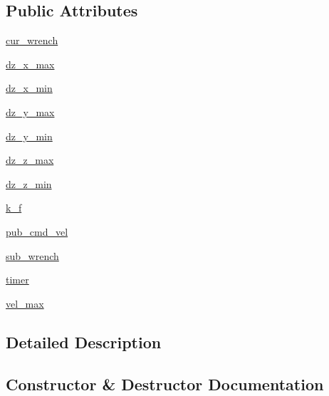 \subsection*{Public Attributes}
\begin{DoxyCompactItemize}
\item 
\hyperlink{classadmittance__ctrl_1_1AdmittanceCtrl_a3654d3f7f31c450d8cb010a4dadb3e18}{cur\+\_\+wrench}
\item 
\hyperlink{classadmittance__ctrl_1_1AdmittanceCtrl_a5f68a4404ad164497f0a5e57adc06ae5}{dz\+\_\+x\+\_\+max}
\item 
\hyperlink{classadmittance__ctrl_1_1AdmittanceCtrl_ae12abadbff515007a7857f4ad04a2068}{dz\+\_\+x\+\_\+min}
\item 
\hyperlink{classadmittance__ctrl_1_1AdmittanceCtrl_af0acd0a0262fbcc79e90b8035e3197d6}{dz\+\_\+y\+\_\+max}
\item 
\hyperlink{classadmittance__ctrl_1_1AdmittanceCtrl_a35e4e59c55a85d6dbc1f5ccfc5b87f25}{dz\+\_\+y\+\_\+min}
\item 
\hyperlink{classadmittance__ctrl_1_1AdmittanceCtrl_ab3d7954604431dd6244691fd54112420}{dz\+\_\+z\+\_\+max}
\item 
\hyperlink{classadmittance__ctrl_1_1AdmittanceCtrl_a6c0fe2e42dde125b1e6f81814ce57c02}{dz\+\_\+z\+\_\+min}
\item 
\hyperlink{classadmittance__ctrl_1_1AdmittanceCtrl_a9a0d5d08a89a7cc49b27a9de9d44d8d6}{k\+\_\+f}
\item 
\hyperlink{classadmittance__ctrl_1_1AdmittanceCtrl_a9e2e5b35def00bad6fc3fec2d80c63c4}{pub\+\_\+cmd\+\_\+vel}
\item 
\hyperlink{classadmittance__ctrl_1_1AdmittanceCtrl_abcd3dae9bd287755d88fb6ab5621b66f}{sub\+\_\+wrench}
\item 
\hyperlink{classadmittance__ctrl_1_1AdmittanceCtrl_a83d7b0847cefa7749b3d4a9672c4d1c4}{timer}
\item 
\hyperlink{classadmittance__ctrl_1_1AdmittanceCtrl_a2d0c030242f05f5aed46ce03810d721a}{vel\+\_\+max}
\end{DoxyCompactItemize}


\subsection{Detailed Description}


\subsection{Constructor \& Destructor Documentation}
